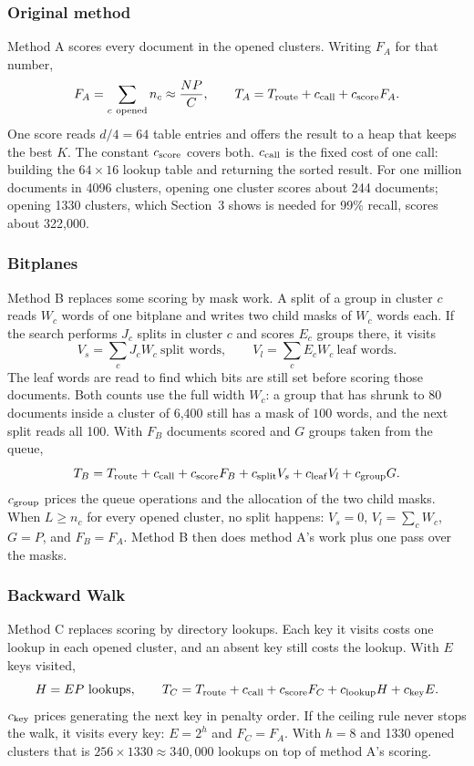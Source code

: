 \subsubsection{Original method}
Method A scores every document in the opened clusters. Writing $F_A$ for that number,
\[
 F_A=\sum_{c\ \text{opened}}n_c\approx\frac{NP}{C},\qquad
 T_A=T_{\rm route}+c_{\rm call}+c_{\rm score}F_A.
\]
One score reads $d/4=64$ table entries and offers the result to a heap that keeps the best
$K$. The constant $c_{\rm score}$ covers both. $c_{\rm call}$ is the fixed cost of one call:
building the $64\times16$ lookup table and returning the sorted result. For one million
documents in 4096 clusters, opening one cluster scores about 244 documents; opening 1330
clusters, which Section~3 shows is needed for 99\% recall, scores about 322,000.

\subsubsection{Bitplanes}
Method B replaces some scoring by mask work. A split of a group in cluster $c$ reads
$W_c$ words of one bitplane and writes two child masks of $W_c$ words each. If the search
performs $J_c$ splits in cluster $c$ and scores $E_c$ groups there, it visits
\[
 V_s=\sum_c J_cW_c\ \text{split words},\qquad
 V_l=\sum_c E_cW_c\ \text{leaf words}.
\]
The leaf words are read to find which bits are still set before scoring those documents.
Both counts use the full width $W_c$: a group that has shrunk to 80 documents inside a
cluster of 6,400 still has a mask of $100$ words, and the next split reads all 100.
With $F_B$ documents scored and $G$ groups taken from the queue,
\[
 T_B=T_{\rm route}+c_{\rm call}+c_{\rm score}F_B+c_{\rm split}V_s+c_{\rm leaf}V_l+c_{\rm group}G.
\]
$c_{\rm group}$ prices the queue operations and the allocation of the two child masks. When
$L\ge n_c$ for every opened cluster, no split happens: $V_s=0$, $V_l=\sum_c W_c$,
$G=P$, and $F_B=F_A$. Method B then does method A's work plus one pass over the masks.

\subsubsection{Backward Walk}
Method C replaces scoring by directory lookups. Each key it visits costs one lookup in each
opened cluster, and an absent key still costs the lookup. With $E$ keys visited,
\[
 H=EP\ \text{lookups},\qquad
 T_C=T_{\rm route}+c_{\rm call}+c_{\rm score}F_C+c_{\rm lookup}H+c_{\rm key}E.
\]
$c_{\rm key}$ prices generating the next key in penalty order. If the ceiling rule never
stops the walk, it visits every key: $E=2^h$ and $F_C=F_A$. With $h=8$ and 1330 opened
clusters that is $256\times1330\approx340{,}000$ lookups on top of method A's scoring.

